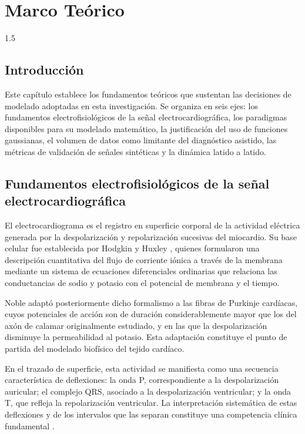 \section{Marco Teórico}\label{sec:background}
\begin{spacing}{1.5}

\subsection{Introducción}

Este capítulo establece los fundamentos teóricos que sustentan las decisiones de modelado adoptadas en esta investigación. Se organiza en seis ejes: los fundamentos electrofisiológicos de la señal electrocardiográfica, los paradigmas disponibles para su modelado matemático, la justificación del uso de funciones gaussianas, el volumen de datos como limitante del diagnóstico asistido, las métricas de validación de señales sintéticas y la dinámica latido a latido.

\subsection{Fundamentos electrofisiológicos de la señal electrocardiográfica}

El electrocardiograma es el registro en superficie corporal de la actividad eléctrica generada por la despolarización y repolarización sucesivas del miocardio. Su base celular fue establecida por Hodgkin y Huxley \cite{hodgkin1952quantitative}, quienes formularon una descripción cuantitativa del flujo de corriente iónica a través de la membrana mediante un sistema de ecuaciones diferenciales ordinarias que relaciona las conductancias de sodio y potasio con el potencial de membrana y el tiempo.

Noble \cite{noble1962modification} adaptó posteriormente dicho formalismo a las fibras de Purkinje cardíacas, cuyos potenciales de acción son de duración considerablemente mayor que los del axón de calamar originalmente estudiado, y en las que la despolarización disminuye la permeabilidad al potasio. Esta adaptación constituye el punto de partida del modelado biofísico del tejido cardíaco.

En el trazado de superficie, esta actividad se manifiesta como una secuencia característica de deflexiones: la onda P, correspondiente a la despolarización auricular; el complejo QRS, asociado a la despolarización ventricular; y la onda T, que refleja la repolarización ventricular. La interpretación sistemática de estas deflexiones y de los intervalos que las separan constituye una competencia clínica fundamental \cite{zumba2023evaluacion}.


\end{spacing}
